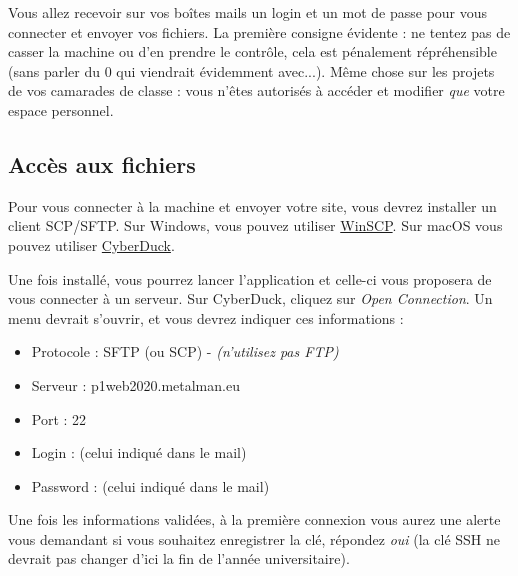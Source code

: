 


\noindent Vous allez recevoir sur vos boîtes mails un login et un mot de passe pour vous connecter et envoyer vos fichiers.
La première consigne évidente : ne tentez pas de casser la machine ou d'en prendre le contrôle, cela est pénalement répréhensible (sans parler du 0 qui viendrait évidemment avec...).
Même chose sur les projets de vos camarades de classe : vous n'êtes autorisés à accéder et modifier \textit{que} votre espace personnel.

\bigskip

\subsection{Accès aux fichiers}

\noindent Pour vous connecter à la machine et envoyer votre site, vous devrez installer un client SCP/SFTP.
Sur Windows, vous pouvez utiliser \href{https://winscp.net}{WinSCP}.
Sur macOS vous pouvez utiliser \href{https://cyberduck.io}{CyberDuck}.

\bigskip

\noindent Une fois installé, vous pourrez lancer l'application et celle-ci vous proposera de vous connecter à un serveur.
Sur CyberDuck, cliquez sur \textit{Open Connection}.
Un menu devrait s'ouvrir, et vous devrez indiquer ces informations :

\bigskip

\begin{itemize}
\item Protocole : SFTP (ou SCP) - \textit{(n'utilisez pas FTP)}
\item Serveur : p1web2020.metalman.eu
\item Port : 22
\item Login : (celui indiqué dans le mail)
\item Password : (celui indiqué dans le mail)
\end{itemize}

\bigskip

\noindent Une fois les informations validées, à la première connexion vous aurez une alerte vous demandant si vous souhaitez enregistrer la clé, répondez \textit{oui} (la clé SSH ne devrait pas changer d'ici la fin de l'année universitaire).

